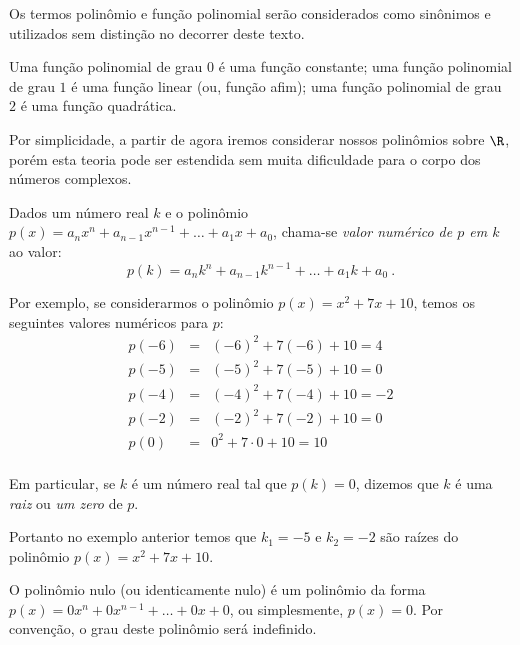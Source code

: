  \begin{obs}
 Os termos polinômio e função polinomial serão considerados como sinônimos e utilizados sem distinção no decorrer deste texto.
 \end{obs}

 Uma função polinomial de grau $0$ é uma função constante; uma função polinomial de grau $1$ é uma função linear (ou, função afim); uma função polinomial de grau $2$ é uma função quadrática.

 Por simplicidade, a partir de agora iremos considerar nossos polinômios sobre $\R$, porém esta teoria pode ser estendida sem muita dificuldade para o corpo dos números complexos.

 \begin{defi}
 Dados um número real $k$ e o polinômio $p(x)= a_nx^n + a_{n-1}x^{n-1}+ \ldots + a_1x+ a_0$, chama-se \emph{valor numérico de $p$ em $k$} ao valor:
\begin{equation}
p(k)= a_nk^n + a_{n-1}k^{n-1}+ \ldots + a_1k+ a_0 \ .
\end{equation}
 \end{defi}

\begin{exem}
Por exemplo, se considerarmos o polinômio $p(x)= x^2 + 7x+10$, temos os seguintes valores numéricos para $p$:
\begin{eqnarray*}
p(-6)&=& (-6)^2 + 7(-6) +10= 4\\
p(-5)&=& (-5)^2 + 7(-5) +10= 0\\
p(-4)&=& (-4)^2 + 7(-4) +10= -2\\
p(-2)&=& (-2)^2 + 7(-2) +10= 0\\
p(0)&=& 0^2 + 7 \cdot 0 +10= 10\\
\end{eqnarray*}
\end{exem}

 \begin{defi}
 Em particular, se $k$ é um número real tal que $p(k)= 0$, dizemos que $k$ é uma \emph{raiz} ou \emph{um zero} de $p$.
 \end{defi}

 \begin{exem}
 Portanto no exemplo anterior temos que $k_1= -5$ e $k_2=-2$ são raízes do polinômio $p(x)= x^2 + 7x+10$.
 \end{exem}

  \begin{defi}
  O polinômio nulo (ou identicamente nulo) é um polinômio da forma $p(x)= 0x^n +0x^{n-1}+ \ldots + 0x+ 0$, ou simplesmente, $p(x)= 0$. Por convenção, o grau deste polinômio será indefinido.
 \end{defi}


